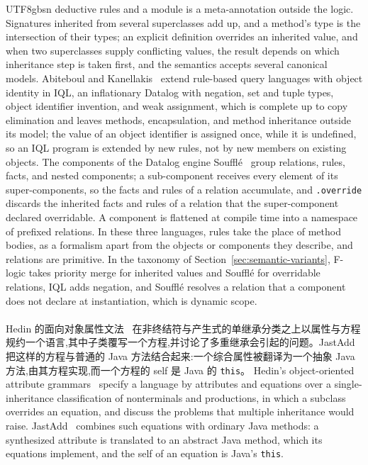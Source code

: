 \begin{CJK*}{UTF8}{gbsn}
deductive rules and a module is a meta-annotation outside the logic.
Signatures inherited from several superclasses add up, and a method's
type is the intersection of their types; an explicit definition
overrides an inherited value, and when two superclasses supply
conflicting values, the result depends on which inheritance step is
taken first, and the semantics accepts several canonical models.
Abiteboul and
Kanellakis~\cite{abiteboul1989-object-identity-query-primitive, abiteboul1998-object-identity-jacm}
extend rule-based query languages with object identity in IQL, an
inflationary Datalog with negation, set and tuple types, object
identifier invention, and weak assignment, which is complete up to
copy elimination and leaves methods, encapsulation, and method
inheritance outside its model; the value of an object identifier is
assigned once, while it is undefined, so an IQL program is extended by
new rules, not by new members on existing objects.
The components of the Datalog engine
Souffl\'e~\cite{souffle-contributors-components} group relations,
rules, facts, and nested components; a sub-component receives every
element of its super-components, so the facts and rules of a relation
accumulate, and \texttt{.override} discards the inherited facts and
rules of a relation that the super-component declared overridable.
A component is flattened at compile time into a namespace of prefixed
relations.
In these three languages, rules take the place of method bodies, as a
formalism apart from the objects or components they describe, and
relations are primitive.
In the taxonomy of Section~\ref{sec:semantic-variants}, F-logic takes priority merge for inherited
values and Souffl\'e for overridable relations, IQL adds negation, and Souffl\'e resolves a relation
that a component does not declare at instantiation, which is dynamic scope.
\fi

\paragraph{}
\ifPaperChinese
Hedin 的面向对象属性文法~\cite{hedin1989-object-oriented-attribute-grammars} 在非终结符与产生式的单继承分类之上以属性与方程规约一个语言,其中子类覆写一个方程,并讨论了多重继承会引起的问题。JastAdd~\cite{hedin2003-jastadd} 把这样的方程与普通的 Java 方法结合起来:一个综合属性被翻译为一个抽象 Java 方法,由其方程实现,而一个方程的 self 是 Java 的 \texttt{this}。
\else
Hedin's object-oriented attribute
grammars~\cite{hedin1989-object-oriented-attribute-grammars} specify a
language by attributes and equations over a single-inheritance
classification of nonterminals and productions, in which a subclass
overrides an equation, and discuss the problems that multiple
inheritance would raise.
JastAdd~\cite{hedin2003-jastadd} combines such equations with ordinary
Java methods: a synthesized attribute is translated to an abstract
Java method, which its equations implement, and the self of an
equation is Java's \texttt{this}.
\fi


\end{CJK*}
